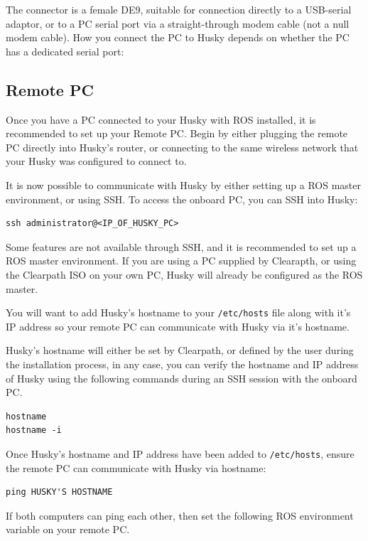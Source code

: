 \documentclass[]{clearpath-latex/clearpath-manual}
\begin{document}
The connector is a female DE9, suitable for connection directly to a USB-serial adaptor, 
or to a PC serial port via a straight-through modem cable (not a null modem cable). 
How you connect the PC to Husky depends on whether the PC has a dedicated serial port:

\subsection{Remote PC}

Once you have a PC connected to your Husky with ROS installed, it is recommended to set up your Remote PC.  
Begin by either plugging the remote PC directly into Husky’s router, or connecting to the same wireless network 
that your Husky was configured to connect to.  

It is now possible to communicate with Husky by either setting up a ROS master environment, or using SSH.  
To access the onboard PC, you can SSH into Husky:

\begin{lstlisting} 
ssh administrator@<IP_OF_HUSKY_PC>
\end{lstlisting}

Some features are not available through SSH, and it is recommended to set up a ROS master environment. 
If you are using a PC supplied by Clearapth, or using the Clearpath ISO on your own PC, Husky will
already be configured as the ROS master.

You will want to add Husky's hostname to your \lstinline{/etc/hosts} file along with it's IP address 
so your remote PC can communicate with Husky via it's hostname.

Husky's hostname will either be set by Clearpath, or defined by the user during the 
installation process, in any case, you can verify the hostname and IP address of Husky using
the following commands during an SSH session with the onboard  PC.

\begin{lstlisting}
hostname
hostname -i
\end{lstlisting}


Once Husky's hostname and IP address have been added to \lstinline{/etc/hosts}, ensure the remote PC
can communicate with Husky via hostname:

\begin{lstlisting}
ping HUSKY'S HOSTNAME
\end{lstlisting}

If both computers can ping each other, then set the following ROS environment variable on your remote PC.
\end{document}
